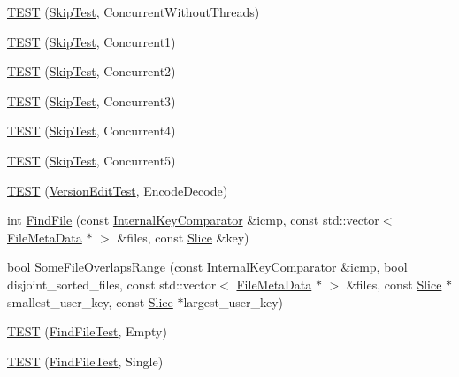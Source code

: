 \begin{DoxyCompactItemize}
\item 
\hyperlink{namespaceleveldb_a7a43c7e5a10488ca82072e3cc871fcb2}{T\+E\+S\+T} (\hyperlink{classleveldb_1_1_skip_test}{Skip\+Test}, Concurrent\+Without\+Threads)
\item 
\hyperlink{namespaceleveldb_a1997f90d2777db110a06646c9a3c7ba2}{T\+E\+S\+T} (\hyperlink{classleveldb_1_1_skip_test}{Skip\+Test}, Concurrent1)
\item 
\hyperlink{namespaceleveldb_a0ac3fd3bf30e8efdbdead6e963ffbe3d}{T\+E\+S\+T} (\hyperlink{classleveldb_1_1_skip_test}{Skip\+Test}, Concurrent2)
\item 
\hyperlink{namespaceleveldb_a95f25d807cc1b1a16a34f9a3a24fb7bc}{T\+E\+S\+T} (\hyperlink{classleveldb_1_1_skip_test}{Skip\+Test}, Concurrent3)
\item 
\hyperlink{namespaceleveldb_a491925bfd0a0eb00edbbbbc0f1d3c0c9}{T\+E\+S\+T} (\hyperlink{classleveldb_1_1_skip_test}{Skip\+Test}, Concurrent4)
\item 
\hyperlink{namespaceleveldb_ae94270b577d135677ad028bef3170a16}{T\+E\+S\+T} (\hyperlink{classleveldb_1_1_skip_test}{Skip\+Test}, Concurrent5)
\item 
\hyperlink{namespaceleveldb_aa3106d7d6e907fc13c8c7ceed76740ad}{T\+E\+S\+T} (\hyperlink{classleveldb_1_1_version_edit_test}{Version\+Edit\+Test}, Encode\+Decode)
\item 
int \hyperlink{namespaceleveldb_a812c4c6cf8299e767535a59f2205df0c}{Find\+File} (const \hyperlink{classleveldb_1_1_internal_key_comparator}{Internal\+Key\+Comparator} \&icmp, const std\+::vector$<$ \hyperlink{structleveldb_1_1_file_meta_data}{File\+Meta\+Data} $\ast$ $>$ \&files, const \hyperlink{classleveldb_1_1_slice}{Slice} \&key)
\item 
bool \hyperlink{namespaceleveldb_a1a6a370f17b20667b885b5b91159c5a9}{Some\+File\+Overlaps\+Range} (const \hyperlink{classleveldb_1_1_internal_key_comparator}{Internal\+Key\+Comparator} \&icmp, bool disjoint\+\_\+sorted\+\_\+files, const std\+::vector$<$ \hyperlink{structleveldb_1_1_file_meta_data}{File\+Meta\+Data} $\ast$ $>$ \&files, const \hyperlink{classleveldb_1_1_slice}{Slice} $\ast$smallest\+\_\+user\+\_\+key, const \hyperlink{classleveldb_1_1_slice}{Slice} $\ast$largest\+\_\+user\+\_\+key)
\item 
\hyperlink{namespaceleveldb_a188b103f7d0b4ade94f516f01a09aa06}{T\+E\+S\+T} (\hyperlink{classleveldb_1_1_find_file_test}{Find\+File\+Test}, Empty)
\item 
\hyperlink{namespaceleveldb_aede67af3ba40cb44c1ff914d7074ba48}{T\+E\+S\+T} (\hyperlink{classleveldb_1_1_find_file_test}{Find\+File\+Test}, Single)

\end{DoxyCompactItemize}
